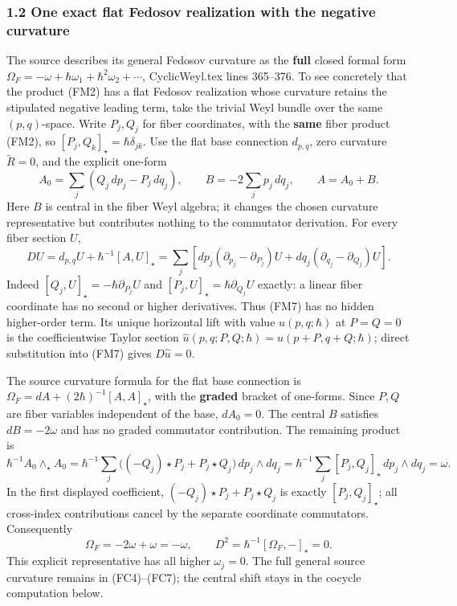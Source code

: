 \documentclass[
  11pt,
]{article}
\begin{document}
\subsubsection{1.2 One exact flat Fedosov realization with the negative
curvature}\label{one-exact-flat-fedosov-realization-with-the-negative-curvature}

The source describes its general Fedosov curvature as the \textbf{full}
closed formal form
\(\Omega_F=-\omega+\hbar\omega_1+\hbar^2\omega_2+\cdots\),
CyclicWeyl.tex lines 365--376. To see concretely that the product (FM2)
has a flat Fedosov realization whose curvature retains the stipulated
negative leading term, take the trivial Weyl bundle over the same
\((p,q)\)-space. Write \(P_j,Q_j\) for fiber coordinates, with the
\textbf{same} fiber product (FM2), so
\([P_j,Q_k]_\star=\hbar\delta_{jk}\). Use the flat base connection
\(d_{p,q}\), zero curvature \(\widetilde R=0\), and the explicit
one-form \[
 A_0=\sum_j(Q_j\,dp_j-P_j\,dq_j),\qquad
 B=-2\sum_jp_j\,dq_j,\qquad A=A_0+B .
 \tag{FM6}
\] Here \(B\) is central in the fiber Weyl algebra; it changes the
chosen curvature representative but contributes nothing to the
commutator derivation. For every fiber section \(U\), \[
 D U=d_{p,q}U+\hbar^{-1}[A,U]_\star
 =\sum_j\left[
   dp_j(\partial_{p_j}-\partial_{P_j})U
  +dq_j(\partial_{q_j}-\partial_{Q_j})U
 \right].
 \tag{FM7}
\] Indeed \([Q_j,U]_\star=-\hbar\partial_{P_j}U\) and
\([P_j,U]_\star=\hbar\partial_{Q_j}U\) exactly: a linear fiber
coordinate has no second or higher derivatives. Thus (FM7) has no hidden
higher-order term. Its unique horizontal lift with value
\(u(p,q;\hbar)\) at \(P=Q=0\) is the coefficientwise Taylor section
\(\widehat u(p,q;P,Q;\hbar)=u(p+P,q+Q;\hbar)\); direct substitution into
(FM7) gives \(D\widehat u=0\).

The source curvature formula for the flat base connection is
\(\Omega_F=dA+(2\hbar)^{-1}[A,A]_\star\), with the \textbf{graded}
bracket of one-forms. Since \(P,Q\) are fiber variables independent of
the base, \(dA_0=0\). The central \(B\) satisfies \(dB=-2\omega\) and
has no graded commutator contribution. The remaining product is \[
 \hbar^{-1}A_0\wedge_\star A_0
 =\hbar^{-1}\sum_j
   \bigl((-Q_j)\star P_j+P_j\star Q_j\bigr)\,dp_j\wedge dq_j
 =\hbar^{-1}\sum_j[P_j,Q_j]_\star\,dp_j\wedge dq_j
 =\omega .
 \tag{FM8}
\] In the first displayed coefficient, \((-Q_j)\star P_j+P_j\star Q_j\)
is exactly \([P_j,Q_j]_\star\); all cross-index contributions cancel by
the separate coordinate commutators. Consequently \[
 \Omega_F=-2\omega+\omega=-\omega,\qquad
 D^2=\hbar^{-1}[\Omega_F,-]_\star=0 .
 \tag{FM9}
\] This explicit representative has all higher \(\omega_j=0\). The full
general source curvature remains in (FC4)--(FC7); the central shift
stays in the cocycle computation below.
\end{document}
